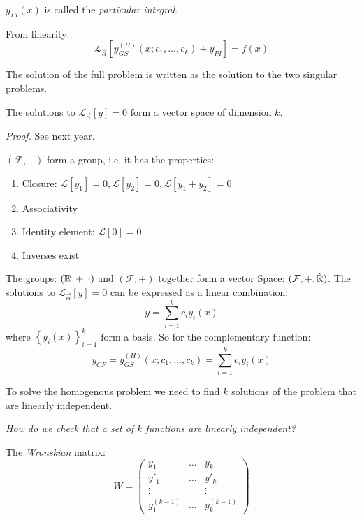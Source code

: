 \documentclass[10pt]{scrartcl}
\begin{document}
    
\begin{definition}
  $y_{PI}(x)$ is called the \emph{particular integral}.
  \end{definition}
 
  From linearity: 
  \[\mathcal{L}_{\vec{\alpha}}[y_{GS}^{(H)}(x;c_1,\dots,c_k)+y_{PI}] = f(x)\]
  
  The solution of the full problem is written as the solution to the two singular problems. 

\begin{theorem}
The solutions to $\mathcal{L}_{\vec{\alpha}}[y]=0$ form a vector space of dimension $k$. 	
\end{theorem}
\textit{Proof.} See next year. 

$(\mathcal{F}, +)$ form a group, i.e. it has the properties:
\begin{enumerate}
  \item Closure: $\mathcal{L}[y_1] = 0, \mathcal{L}[y_2] = 0, \mathcal{L}[y_1 + y_2] = 0$
  \item Associativity
  \item Identity element: $\mathcal{L}[0] = 0$
  \item Inverses exist
\end{enumerate}

The groups: $(\mathbb{R}, +, \cdot)$ and $(\mathcal{F}, +)$ together form a vector Space: $(\mathcal{F},+,\dot{\mathbb{R}})$. The solutions to $\mathcal{L}_{\vec{\alpha}}[y] = 0$ can be expressed as a linear combination:
\[y = \sum_{i=1}^kc_iy_i(x)\]
where $\left\{y_i(x)\right\}_{i=1}^k$ form a basis. So for the complementary function:
\[y_{CF} = y_{GS}^{(H)}(x;c_1,\dots,c_k) = \sum_{i=1}^kc_iy_i(x)\]

To solve the homogenous problem we need to find $k$ solutions of the problem that are linearly independent. 

\emph{How do we check that a set of $k$ functions are linearly independent?}\\

\begin{definition}
The \emph{Wronskian} matrix:
\[W = 
\begin{pmatrix}
y_1 & \dots & y_k\\
y'_1 & \dots & y'_k\\
\vdots & & \vdots\\
y^{(k-1)}_1 & \dots & y^{(k-1)}_k	
\end{pmatrix}
\]	
\end{definition}
\end{document}

